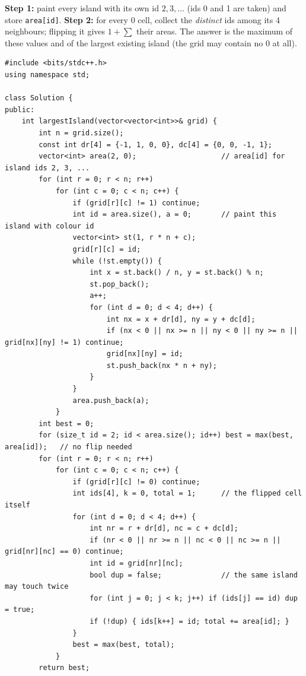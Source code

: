 \begin{solutionbox}
\textbf{Step 1:} paint every island with its own id $2, 3, \dots$ (ids 0 and 1 are taken) and store \texttt{area[id]}. \textbf{Step 2:} for every $0$ cell, collect the \emph{distinct} ids among its 4 neighbours; flipping it gives $1 + \sum$ their areas. The answer is the maximum of these values and of the largest existing island (the grid may contain no $0$ at all).
\begin{lstlisting}[style=cpp]
#include <bits/stdc++.h>
using namespace std;

class Solution {
public:
    int largestIsland(vector<vector<int>>& grid) {
        int n = grid.size();
        const int dr[4] = {-1, 1, 0, 0}, dc[4] = {0, 0, -1, 1};
        vector<int> area(2, 0);                    // area[id] for island ids 2, 3, ...
        for (int r = 0; r < n; r++)
            for (int c = 0; c < n; c++) {
                if (grid[r][c] != 1) continue;
                int id = area.size(), a = 0;       // paint this island with colour id
                vector<int> st(1, r * n + c);
                grid[r][c] = id;
                while (!st.empty()) {
                    int x = st.back() / n, y = st.back() % n;
                    st.pop_back();
                    a++;
                    for (int d = 0; d < 4; d++) {
                        int nx = x + dr[d], ny = y + dc[d];
                        if (nx < 0 || nx >= n || ny < 0 || ny >= n || grid[nx][ny] != 1) continue;
                        grid[nx][ny] = id;
                        st.push_back(nx * n + ny);
                    }
                }
                area.push_back(a);
            }
        int best = 0;
        for (size_t id = 2; id < area.size(); id++) best = max(best, area[id]);   // no flip needed
        for (int r = 0; r < n; r++)
            for (int c = 0; c < n; c++) {
                if (grid[r][c] != 0) continue;
                int ids[4], k = 0, total = 1;      // the flipped cell itself
                for (int d = 0; d < 4; d++) {
                    int nr = r + dr[d], nc = c + dc[d];
                    if (nr < 0 || nr >= n || nc < 0 || nc >= n || grid[nr][nc] == 0) continue;
                    int id = grid[nr][nc];
                    bool dup = false;              // the same island may touch twice
                    for (int j = 0; j < k; j++) if (ids[j] == id) dup = true;
                    if (!dup) { ids[k++] = id; total += area[id]; }
                }
                best = max(best, total);
            }
        return best;

\end{lstlisting}
\end{solutionbox}
